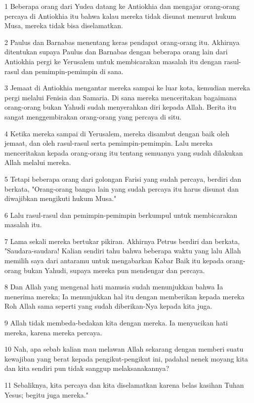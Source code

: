 \par 1 Beberapa orang dari Yudea datang ke Antiokhia dan mengajar orang-orang percaya di Antiokhia itu bahwa kalau mereka tidak disunat menurut hukum Musa, mereka tidak bisa diselamatkan.
\par 2 Paulus dan Barnabas menentang keras pendapat orang-orang itu. Akhirnya ditentukan supaya Paulus dan Barnabas dengan beberapa orang lain dari Antiokhia pergi ke Yerusalem untuk membicarakan masalah itu dengan rasul-rasul dan pemimpin-pemimpin di sana.
\par 3 Jemaat di Antiokhia mengantar mereka sampai ke luar kota, kemudian mereka pergi melalui Fenisia dan Samaria. Di sana mereka menceritakan bagaimana orang-orang bukan Yahudi sudah menyerahkan diri kepada Allah. Berita itu sangat menggembirakan orang-orang yang percaya di situ.
\par 4 Ketika mereka sampai di Yerusalem, mereka disambut dengan baik oleh jemaat, dan oleh rasul-rasul serta pemimpin-pemimpin. Lalu mereka menceritakan kepada orang-orang itu tentang semuanya yang sudah dilakukan Allah melalui mereka.
\par 5 Tetapi beberapa orang dari golongan Farisi yang sudah percaya, berdiri dan berkata, "Orang-orang bangsa lain yang sudah percaya itu harus disunat dan diwajibkan mengikuti hukum Musa."
\par 6 Lalu rasul-rasul dan pemimpin-pemimpin berkumpul untuk membicarakan masalah itu.
\par 7 Lama sekali mereka bertukar pikiran. Akhirnya Petrus berdiri dan berkata, "Saudara-saudara! Kalian sendiri tahu bahwa beberapa waktu yang lalu Allah memilih saya dari antaramu untuk mengabarkan Kabar Baik itu kepada orang-orang bukan Yahudi, supaya mereka pun mendengar dan percaya.
\par 8 Dan Allah yang mengenal hati manusia sudah menunjukkan bahwa Ia menerima mereka; Ia menunjukkan hal itu dengan memberikan kepada mereka Roh Allah sama seperti yang sudah diberikan-Nya kepada kita juga.
\par 9 Allah tidak membeda-bedakan kita dengan mereka. Ia menyucikan hati mereka, karena mereka percaya.
\par 10 Nah, apa sebab kalian mau melawan Allah sekarang dengan memberi suatu kewajiban yang berat kepada pengikut-pengikut ini, padahal nenek moyang kita dan kita sendiri pun tidak sanggup melaksanakannya?
\par 11 Sebaliknya, kita percaya dan kita diselamatkan karena belas kasihan Tuhan Yesus; begitu juga mereka."

